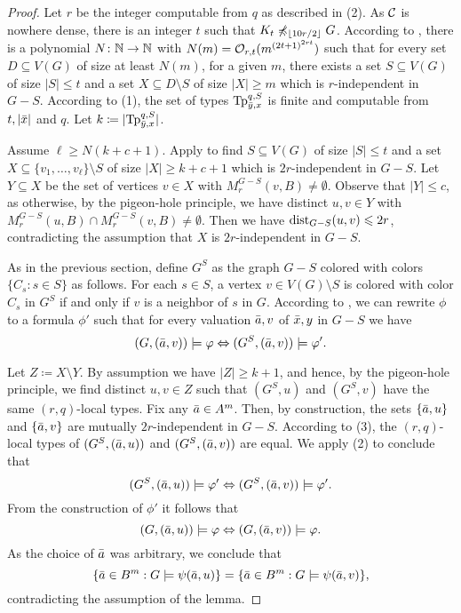 \begin{proof}
Let $r$
be the integer computable from $q$ as described in  (2). 
As $\mathcal{C}$ is nowhere dense, there is an integer $t$ such that 
$K_t\not\preccurlyeq_{\lfloor 10r/2\rfloor} G$. According to 
, there is a polynomial  $N\colon \mathbb{N}\to \mathbb{N}$ with $N(m)=
\mathcal{O}_{r,t}{(m^{{(2t+1)}^{2rt}})}$ such that for every set $D\subseteq V(G)$
of size at least $N(m)$, for a given $m$, there exists a set $S\subseteq V(G)$ of size $|S|\leq t$ 
and a set $X\subseteq D\setminus S$ of size $|X|\geq m$ which is $r$-independent in $G-S$.
According to  (1), the set of types $\mathrm{Tp}^{q,S}_{\bar{y},x}$ is 
finite and computable from $t,|\bar{x}|$ and $q$. Let $k\coloneqq |\mathrm{Tp}^{q,S}_{\bar{y},x}|$. 

Assume $\ell\geq N(k+c+1)$. Apply  to find $S\subseteq V(G)$ of size $|S|\leq t$ 
and a set $X\subseteq \{v_1,\ldots, v_\ell\}\setminus S$ of size $|X|\geq k+c+1$ which is 
$2r$-independent in $G-S$. Let $Y\subseteq X$ be the set of vertices $v\in X$ 
with $M_r^{G-S}(v,B)\neq \emptyset$. Observe that $|Y|\leq c$, as otherwise, by the pigeon-hole 
principle, we have distinct $u,v\in Y$ with $M_r^{G-S}(u,B)\cap M_r^{G-S}(v,B)\neq \emptyset$. 
Then we have $\mathrm{dist}_{G-S}(u,v)\leqslant 2r$, contradicting the assumption that 
$X$ is $2r$-independent in $G-S$. 

As in the previous section, define $G^S$ as the graph $G-S$
colored with colors $\{C_s : s\in S\}$ as follows. For each $s\in S$, a vertex $v\in V(G)\setminus S$
is colored with color $C_s$ in $G^S$ if and only if $v$ is a neighbor of $s$ in $G$. 
According to , we can rewrite $\phi$ to a formula $\phi'$ such that
for every valuation $\bar{a},v$ of $\bar{x},y$ in $G-S$ we have 
\[(G,(\bar{a},v))\models \varphi\Leftrightarrow (G^S,(\bar{a},v))\models \varphi'.\]

Let $Z\coloneqq X\setminus Y$. By assumption we have $|Z|\geq k+1$, and hence, by 
the pigeon-hole principle, we find distinct $u,v\in Z$ such that 
$(G^S,u)$ and $(G^S,v)$ have the same $(r,q)$-local types. Fix any $\bar{a}\in A^m$. 
Then, by construction, the sets $\{\bar{a}, u\}$ and $\{\bar{a},v\}$ are mutually $2r$-independent
in $G-S$. 
According to  (3), the $(r,q)$-local types of $(G^S,(\bar{a},u))$ and 
$(G^S,(\bar{a},v))$ are equal. We apply  (2) to conclude that 
\[(G^S, (\bar{a},u))\models \varphi'\Leftrightarrow(G^S, (\bar{a},v))\models \varphi'.\]
From the construction of $\phi'$ it follows that 
\[(G, (\bar{a},u))\models \varphi\Leftrightarrow(G, (\bar{a},v))\models \varphi.\]
As the choice of $\bar{a}$ was arbitrary, we conclude that 
\[\{\bar{a} \in B^m : G\models\psi(\bar{a},u)\}= \{\bar{a} \in B^m : G\models\psi(\bar{a},v)\},\]
contradicting the assumption of the lemma. 
\end{proof}

